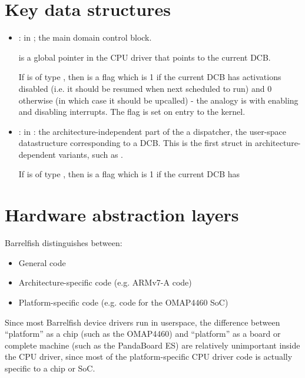 \documentclass[a4paper,twoside]{report} %
\begin{document}
\chapter{Key data structures}

\begin{itemize}
\item {}: in ;
  the main domain control block.   

   is a global pointer in the CPU driver that points
  to the current DCB. 
  
  If  is of type , then
   is a flag which is 1 if the current DCB has
  activations disabled (i.e. it should be resumed when next scheduled
  to run) and 0 otherwise (in which case it should be upcalled) - the
  analogy is with enabling and disabling interrupts.   The flag is set
  on entry to the kernel.

\item {}: in
  : the
  architecture-independent part of the a dispatcher, the user-space
  datastructure corresponding to a DCB.   This is the first struct in
  architecture-dependent variants, such as .

  If  is of type , then
   is a flag which is 1 if the current DCB has

\end{itemize}

\chapter{Hardware abstraction layers}

Barrelfish distinguishes between:
\begin{itemize}
\item General code
\item Architecture-specific code (e.g. ARMv7-A code)
\item Platform-specific code (e.g. code for the OMAP4460 SoC)
\end{itemize}

Since most Barrelfish device drivers run in userspace, the difference
between ``platform'' as a chip (such as the OMAP4460) and ``platform''
as a board or complete machine (such as the PandaBoard ES) are
relatively unimportant inside the CPU driver, since most of the
platform-specific CPU driver code is actually specific to a chip or
SoC.
\end{document}
